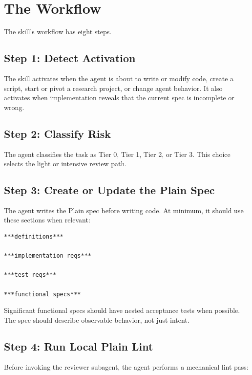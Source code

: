 \documentclass[11pt]{article}
\begin{document}
\section{The Workflow}

The skill's workflow has eight steps.

\subsection{Step 1: Detect Activation}

The skill activates when the agent is about to write or modify code, create a
script, start or pivot a research project, or change agent behavior. It also
activates when implementation reveals that the current spec is incomplete or
wrong.

\subsection{Step 2: Classify Risk}

The agent classifies the task as Tier 0, Tier 1, Tier 2, or Tier 3. This choice
selects the light or intensive review path.

\subsection{Step 3: Create or Update the Plain Spec}

The agent writes the Plain spec before writing code. At minimum, it should use
these sections when relevant:

\begin{lstlisting}
***definitions***

***implementation reqs***

***test reqs***

***functional specs***
\end{lstlisting}

Significant functional specs should have nested acceptance tests when possible.
The spec should describe observable behavior, not just intent.

\subsection{Step 4: Run Local Plain Lint}

Before invoking the reviewer subagent, the agent performs a mechanical lint pass:
\end{document}
